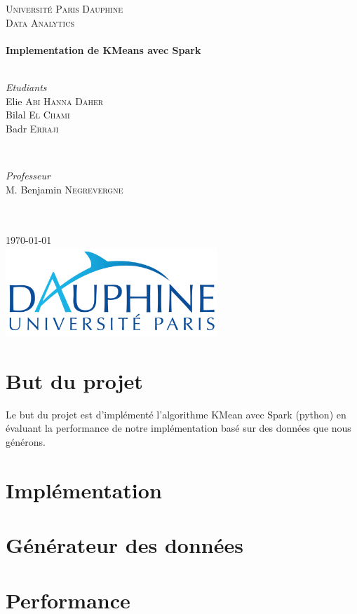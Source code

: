 \documentclass[french]{article}
\begin{document}
\begin{titlepage}
\SetDate[29/04/2018]
\newcommand{\HRule}{\rule{\linewidth}{0.5mm}}
\center 
\textsc{\LARGE Université Paris Dauphine}\\[1.5cm] 
\textsc{\Large Data Analytics}\\[0.5cm]
\HRule \\[0.4cm] { \huge \bfseries
Implementation de KMeans avec Spark}\\[0.4cm] \HRule \\[1.5cm]
\begin{minipage}{0.4\textwidth}
	\begin{flushleft} \large
		\emph{Etudiants}
		\\ Elie \textsc{Abi Hanna Daher}
		\\ Bilal \textsc{El Chami}
		\\ Badr \textsc{Erraji}
	\end{flushleft}
\end{minipage}
~
\begin{minipage}{0.4\textwidth}
	\begin{flushright} \large
		\emph{Professeur} 
		\\ M. Benjamin \textsc{Negrevergne}
		\\  \hspace{1cm}
		\\  \hspace{1cm}
	\end{flushright}
\end{minipage}\\[2cm]
{\large \today}\\[2cm]
\includegraphics[width=8cm]{img/dauphine.png}
\vfill
\end{titlepage}
 
\tableofcontents 
\newpage

\section{But du projet}
Le but du projet est d'implémenté l'algorithme KMean avec Spark (python) en évaluant la performance de notre implémentation basé sur des données que nous générons.

\section{Implémentation}

\section{Générateur des données}

\section{Performance}
\end{document}
